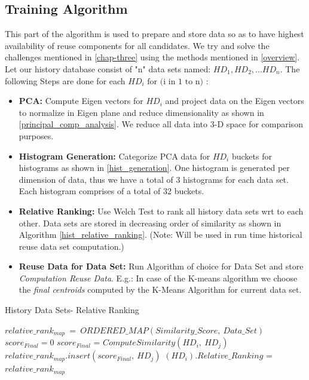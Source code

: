 \subsection{Training Algorithm}
This part of the algorithm is used to prepare and store data so as to have highest availability of reuse components for all candidates. We try and solve the challenges mentioned in \autoref{chap-three} using the methods mentioned in \ref{overview}. 
Let our history database consist of "n" data sets named: $HD_1, HD_2, ... HD_n$.
The following Steps are done for each $HD_i \text{  for (i in 1 to n) } $:
\begin{itemize}
    \item \label{pca_gen_training} \textbf{PCA:} Compute Eigen vectors for $HD_i$ and project data on the Eigen vectors to normalize in Eigen plane and reduce dimensionality as shown in \ref{principal_comp_analysis}. We reduce all data into 3-D space for comparison purposes.
    \item \label{his_gen_training} \textbf{Histogram Generation:} Categorize PCA data for $HD_i$ buckets for histograms as shown in \ref{hist_generation}. One histogram is generated per dimension of data, thus we have a total of 3 histograms for each data set. Each histogram comprises of a total of 32 buckets. 
    \item \textbf{Relative Ranking:} Use Welch Test to rank all history data sets wrt to each other. Data sets are stored in decreasing order of similarity as shown in Algorithm \ref{hist_relative_ranking}. (Note: Will be used in run time historical reuse data set computation.)
    \item \textbf{Reuse Data for Data Set:} Run Algorithm of choice for Data Set and store \textit{Computation Reuse Data}. E.g.: In case of the K-means algorithm we choose the \textit{final centroids} computed by the K-Means Algorithm for current data set.
\end{itemize}


\begin{algorithm}
\caption{History Data Sets- Relative Ranking}
\label{hist_relative_ranking}
\begin{algorithmic}[1]
\State $relative\_rank_{map}\ =\ ORDERED\_MAP(Similarity\_Score,\ Data\_Set)$
\State $score_{Final} = 0$
		\State $score_{Final}$ = $ComputeSimilarity(HD_i,\ HD_j)$
		\State $relative\_rank_{map}.insert(score_{Final},\ HD_j)$
	\EndFor
	\State$(HD_i).Relative\_Ranking$ = $relative\_rank_{map}$
\EndFor
\EndProcedure
\end{algorithmic}
\end{algorithm}

